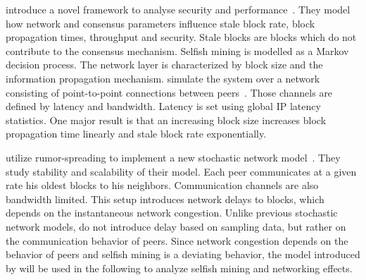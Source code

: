 \citeauthor{gervais2016security} introduce a novel framework to analyse security and performance~\cite{gervais2016security}. They model how network and consensus parameters influence stale block rate, block propagation times, throughput and security. Stale blocks are blocks which do not contribute to the consensus mechanism. Selfish mining is modelled as a Markov decision process. The network layer is characterized by block size and the information propagation mechanism. \citeauthor{gervais2016security} simulate the system over a network consisting of point-to-point connections between peers~\cite{gervais2016security}. Those channels are defined by latency and bandwidth. Latency is set using global IP latency statistics. One major result is that an increasing block size increases block propagation time linearly and stale block rate exponentially. 

\citeauthor{gopalan} utilize rumor-spreading to implement a new stochastic network model~\cite{gopalan}. They study stability and scalability of their model. Each peer communicates at a given rate his oldest blocks to his neighbors. Communication channels are also bandwidth limited. This setup introduces network delays to blocks, which depends on the instantaneous network congestion.
Unlike previous stochastic network models, \citeauthor{gopalan} do not introduce delay based on sampling data, but rather on the communication behavior of peers. Since network congestion depends on the behavior of peers and selfish mining is a deviating behavior, the model introduced by \citeauthor{gopalan} will be used in the following to analyze selfish mining and networking effects.

